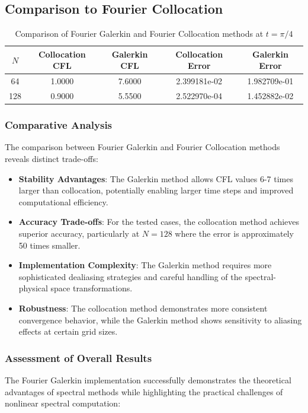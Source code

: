 \subsection{Comparison to Fourier Collocation}

\begin{table}[h]
	\centering
	\begin{tabular}{|c|c|c|c|c|}
		\hline
		$N$ & Collocation CFL & Galerkin CFL & Collocation Error & Galerkin Error \\
		\hline
		64  & 1.0000          & 7.6000       & 2.399181e-02      & 1.982709e-01   \\
		128 & 0.9000          & 5.5500       & 2.522970e-04      & 1.452882e-02   \\
		\hline
	\end{tabular}
	\caption{Comparison of Fourier Galerkin and Fourier Collocation methods at $t = \pi/4$}
	\label{tab:comparison}
\end{table}

\subsubsection{Comparative Analysis}
The comparison between Fourier Galerkin and Fourier Collocation methods reveals distinct trade-offs:

\begin{itemize}
	\item \textbf{Stability Advantages}: The Galerkin method allows CFL values 6-7 times larger than collocation, potentially enabling larger time steps and improved computational efficiency.
	\item \textbf{Accuracy Trade-offs}: For the tested cases, the collocation method achieves superior accuracy, particularly at $N=128$ where the error is approximately 50 times smaller.
	\item \textbf{Implementation Complexity}: The Galerkin method requires more sophisticated dealiasing strategies and careful handling of the spectral-physical space transformations.
	\item \textbf{Robustness}: The collocation method demonstrates more consistent convergence behavior, while the Galerkin method shows sensitivity to aliasing effects at certain grid sizes.
\end{itemize}

\subsubsection{Assessment of Overall Results}
The Fourier Galerkin implementation successfully demonstrates the theoretical advantages of spectral methods while highlighting the practical challenges of nonlinear spectral computation:

